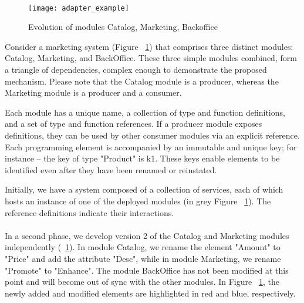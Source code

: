 \paragraph{}

\begin{figure}[htbp]
    \centering
    \texttt{[image: adapter\_example]}
    \caption{Evolution of modules Catalog, Marketing, Backoffice}
    \label{fig:evolution_of_modules}
\end{figure}

Consider a marketing system (Figure ~\ref{fig:evolution_of_modules}) that comprises three distinct modules: Catalog, Marketing, and BackOffice.
These three simple modules combined, form a triangle of dependencies, complex enough to demonstrate the proposed mechanism.
Please note that the Catalog module is a producer, whereas the Marketing module is a producer and a consumer.

Each module has a unique name, a collection of type and function definitions, and a set of type and function references.
If a producer module exposes definitions, they can be used by other consumer modules via an explicit reference.
Each programming element is accompanied by an immutable and unique key; for instance – the key of type "Product" is k1.
These keys enable elements to be identified even after they have been renamed or reinstated.

Initially, we have a system composed of a collection of services,
each of which hosts an instance of one of the deployed modules (in grey Figure ~\ref{fig:evolution_of_modules}).
The reference definitions indicate their interactions.

\paragraph{}

In a second phase, we develop version 2 of the Catalog and Marketing modules independently (~\ref{fig:evolution_of_modules}).
In module Catalog, we rename the element "Amount" to "Price" and add the attribute "Desc", while in module Marketing, we rename "Promote" to "Enhance".
The module BackOffice has not been modified at this point and will become out of sync with the other modules.
In Figure ~\ref{fig:evolution_of_modules}, the newly added and modified elements are highlighted in red and blue, respectively.

\paragraph{}

